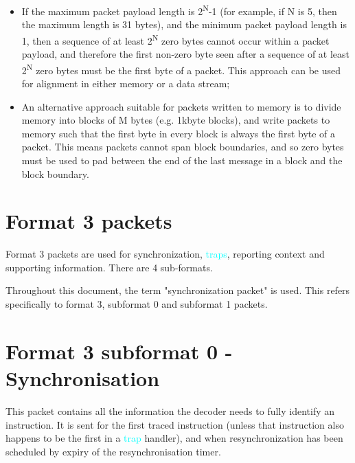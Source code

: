 \begin{itemize}
  \item If the maximum packet payload length is 2\textsuperscript{N}-1 (for example, if N is 5, then the maximum length is
    31 bytes), and the minimum packet payload length is 1, then a sequence of at least 2\textsuperscript{N} zero 
    bytes cannot occur within a packet payload, and therefore the first non-zero byte seen after a sequence of 
    at least 2\textsuperscript{N} zero bytes must be the first byte of a packet.  This approach can be used for
    alignment in either memory or a data stream;
  \item An alternative approach suitable for packets written to memory is to divide memory into blocks of M bytes
    (e.g. 1kbyte blocks), and write packets to memory such that the first byte in every block is always the first
    byte of a packet.  This means packets cannot span block boundaries, and so zero bytes must be used to pad between 
    the end of the last message in a block and the block boundary.
\end{itemize}

\section{Format 3 packets} \label{sec:format3}

Format 3 packets are used for synchronization, \textcolor{cyan}{traps}, reporting context and supporting information.  
There are 4 sub-formats.

Throughout this document, the term "synchronization packet" is used.  This refers specifically to format 3, 
subformat 0 and subformat 1 packets.

\section{Format 3 subformat 0 - Synchronisation} \label{sec:format30}

This packet contains all the information the decoder needs to fully identify an instruction.  It is sent for
the first traced instruction (unless that instruction also happens to be the first in a \textcolor{cyan}{trap} handler), 
and when resynchronization has been scheduled by expiry of the resynchronisation timer.

